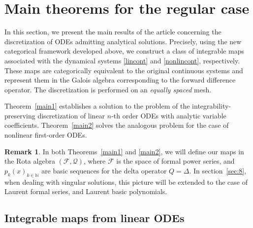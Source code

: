 \documentclass[10pt]{amsart}
\numberwithin{equation}{section}
\theoremstyle{definition}
\newtheorem{remark}{\textbf{Remark}}
\begin{document}
\section{Main theorems for the regular case}
\label{sec:5}

In this section, we present the main results of the article concerning
the discretization of ODEs admitting analytical solutions. Precisely, using
the new categorical framework developed above, we construct a class of
integrable maps associated with the dynamical systems \eqref{lincont} and  \eqref{nonlincont}, respectively. These maps are categorically equivalent
to the original continuous systems and represent them in the Galois algebra
corresponding to the forward difference operator. The discretization is
performed on an \emph{equally spaced} mesh.

Theorem~\ref{main1} establishes a solution to the problem of the integrability-preserving
discretization of linear $n$-th order ODEs with analytic variable coefficients.
 Theorem~\ref{main2} solves the analogous problem for the case of nonlinear
first-order ODEs.


\begin{remark}
In both Theorems~\ref{main1} and \ref{main2}, we will define our maps in
the Rota algebra $(\mathcal{F}, \mathcal{Q})$, where $\mathcal{F}$ is the
space of formal power series, and $p_{k}(x)_{k\in \mathbb{N}}$ are basic
sequences for the delta operator $Q=\Delta $. In section~\ref{sec:8}, when
dealing with singular solutions, this picture will be extended to the case
of Laurent formal series, and Laurent basic polynomials.
\end{remark}

\subsection{Integrable maps from linear ODEs}
\label{sec5.1}
\end{document}

